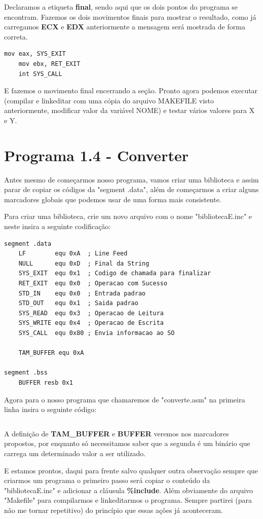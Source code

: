 Declaramos a etiqueta \textbf{final}, sendo aqui que os dois pontos do programa se encontram. Fazemos os dois movimentos finais para mostrar o resultado, como já carregamos \textbf{ECX} e \textbf{EDX} anteriormente a mensagem será mostrada de forma correta.

\begin{lstlisting}[]
	mov eax, SYS_EXIT
	mov ebx, RET_EXIT
	int SYS_CALL 
\end{lstlisting}

E fazemos o movimento final encerrando a seção. Pronto agora podemos executar (compilar e linkeditar com uma cópia do arquivo MAKEFILE visto anteriormente, modificar valor da variável NOME) e testar vários valores para X e Y.

\section{Programa 1.4 - Converter}
Antes mesmo de começarmos nosso programa, vamos criar uma biblioteca e assim parar de copiar os códigos da "segment .data", além de começarmos a criar alguns marcadores globais que podemos usar de uma forma mais consistente.

Para criar uma biblioteca, crie um novo arquivo com o nome "bibliotecaE.inc" e neste insira a seguinte codificação:
\begin{lstlisting}[]
segment .data
	LF        equ 0xA  ; Line Feed
	NULL      equ 0xD  ; Final da String
	SYS_EXIT  equ 0x1  ; Codigo de chamada para finalizar
	RET_EXIT  equ 0x0  ; Operacao com Sucesso
	STD_IN    equ 0x0  ; Entrada padrao
	STD_OUT   equ 0x1  ; Saida padrao
	SYS_READ  equ 0x3  ; Operacao de Leitura
	SYS_WRITE equ 0x4  ; Operacao de Escrita
	SYS_CALL  equ 0x80 ; Envia informacao ao SO

  	TAM_BUFFER equ 0xA

segment .bss
	BUFFER resb 0x1
\end{lstlisting}

Agora para o nosso programa que chamaremos de "converte.asm" na primeira linha insira o seguinte código:
\begin{lstlisting}[]
%include 'bibliotecaE.inc'
\end{lstlisting}

A definição de \textbf{TAM\_BUFFER} e \textbf{BUFFER} veremos nos marcadores propostos, por enquanto só necessitamos saber que a segunda é um binário que carrega um determinado valor a ser utilizado.

E estamos prontos, daqui para frente salvo qualquer outra observação sempre que criarmos um programa o primeiro passo será copiar o conteúdo da "bibliotecaE.inc" e adicionar a cláusula \textbf{\%include}. Além obviamente do arquivo "Makefile" para compilarmos e linkeditarmos o programa. Sempre partirei (para não me tornar repetitivo) do princípio que essas ações já aconteceram.

